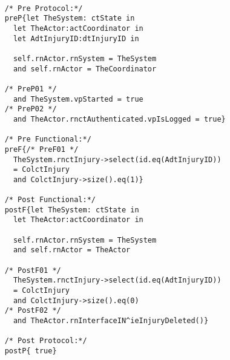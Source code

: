 	\scriptsize
	\vspace{0.5cm}
	\begin{lstlisting}[style=MessirStyle,firstnumber=auto,captionpos=b,caption={\msrmessir (MCL-oriented) specification of the operation \emph{oeDeleteInjury}.},label=OM-actCoordinator-oeDeleteInjury-MCL-LST]

	/* Pre Protocol:*/ 
	preP{let TheSystem: ctState in
	  let TheActor:actCoordinator in
	  let AdtInjuryID:dtInjuryID in
	  
	  self.rnActor.rnSystem = TheSystem
	  and self.rnActor = TheCoordinator
	  
	/* PreP01 */
	  and TheSystem.vpStarted = true
	/* PreP02 */
	  and TheActor.rnctAuthenticated.vpIsLogged = true}
	
	/* Pre Functional:*/
	preF{/* PreF01 */
	  TheSystem.rnctInjury->select(id.eq(AdtInjuryID))
	  = ColctInjury
	  and ColctInjury->size().eq(1)}
	
	/* Post Functional:*/ 
	postF{let TheSystem: ctState in
	  let TheActor:actCoordinator in
	  
	  self.rnActor.rnSystem = TheSystem
	  and self.rnActor = TheActor
	  
	/* PostF01 */
	  TheSystem.rnctInjury->select(id.eq(AdtInjuryID))
	  = ColctInjury
	  and ColctInjury->size().eq(0)
	/* PostF02 */
	  and TheActor.rnInterfaceIN^ieInjuryDeleted()}
	
	/* Post Protocol:*/ 
	postP{ true}
	
	\end{lstlisting}
	\normalsize 
	
	
	
	





